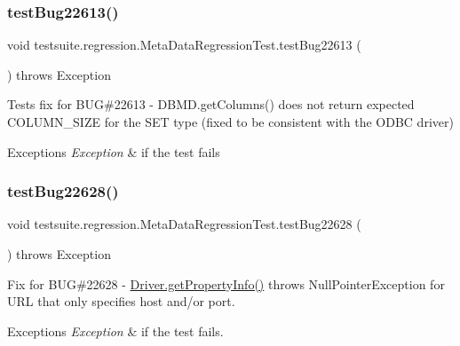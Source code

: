 \subsubsection{\texorpdfstring{test\+Bug22613()}{testBug22613()}}
{\footnotesize\ttfamily void testsuite.\+regression.\+Meta\+Data\+Regression\+Test.\+test\+Bug22613 (\begin{DoxyParamCaption}{ }\end{DoxyParamCaption}) throws Exception}

Tests fix for B\+UG\#22613 -\/ D\+B\+M\+D.\+get\+Columns() does not return expected C\+O\+L\+U\+M\+N\+\_\+\+S\+I\+ZE for the S\+ET type (fixed to be consistent with the O\+D\+BC driver)


\begin{DoxyExceptions}{Exceptions}
{\em Exception} & if the test fails \\
\hline
\end{DoxyExceptions}
\mbox{\label{classtestsuite_1_1regression_1_1_meta_data_regression_test_a1a86a1e268439afcb06e201e8c7bd486}} 
\subsubsection{\texorpdfstring{test\+Bug22628()}{testBug22628()}}
{\footnotesize\ttfamily void testsuite.\+regression.\+Meta\+Data\+Regression\+Test.\+test\+Bug22628 (\begin{DoxyParamCaption}{ }\end{DoxyParamCaption}) throws Exception}

Fix for B\+UG\#22628 -\/ \mbox{\hyperlink{classcom_1_1mysql_1_1cj_1_1jdbc_1_1_non_registering_driver_ad132531e673998633349a65c4c3eb402}{Driver.\+get\+Property\+Info()}} throws Null\+Pointer\+Exception for U\+RL that only specifies host and/or port.


\begin{DoxyExceptions}{Exceptions}
{\em Exception} & if the test fails. \\
\hline
\end{DoxyExceptions}
\mbox{\label{classtestsuite_1_1regression_1_1_meta_data_regression_test_ab3ee32d4d432ff0acdba1990e9dde9ba}} 
